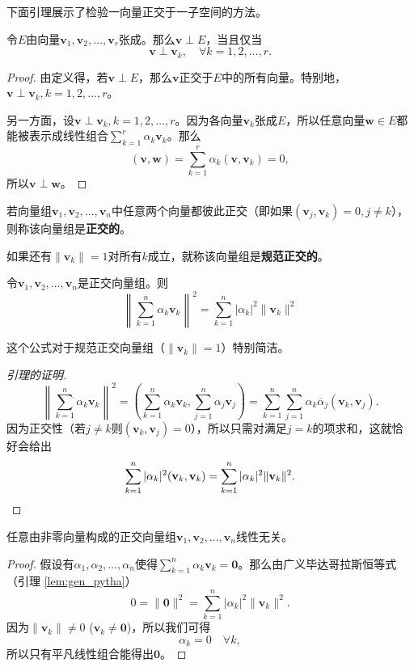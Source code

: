 下面引理展示了检验一向量正交于一子空间的方法。

\begin{lemma}\label{lem:vec_ortho_subspace}
    令$E$由向量$\mathbf{v}_{1},\mathbf{v}_{2},\ldots,\mathbf{v}_{r}$张成。那么$\mathbf{v}\perp E$，当且仅当\[\mathbf{v}\perp\mathbf{v}_{k},\quad\forall k=1,2,\ldots,r.\]
\end{lemma}
\begin{proof}
    由定义得，若$\mathbf{v}\perp E$，那么$\mathbf{v}$正交于$E$中的所有向量。特别地，$\mathbf{v}\perp\mathbf{v}_{k}, k=1,2,\ldots,r$。

    另一方面，设$\mathbf{v}\perp\mathbf{v}_{k}, k=1,2,\ldots,r$。因为各向量$\mathbf{v}_k$张成$E$，所以任意向量$\mathbf{w}\in E$都能被表示成线性组合$\sum_{k=1}^{r}\alpha_{k}\mathbf{v}_{k}$。那么\[(\mathbf{v},\mathbf{w})=\sum_{k=1}^r\alpha_k(\mathbf{v},\mathbf{v}_k)=0,\]
    所以$\mathbf{v}\perp \mathbf{w}$。
\end{proof}
\begin{definition}
    若向量组$\mathbf{v}_{1},\mathbf{v}_{2},\ldots,\mathbf{v}_{n}$中任意两个向量都彼此正交（即如果$(\mathbf{v}_{j},\mathbf{v}_{k})=0,j\neq k$），则称该向量组是{\bf 正交的}。

    如果还有$\|\mathbf{v}_k\|=1$对所有$k$成立，就称该向量组是{\bf 规范正交的}。
\end{definition}

\begin{lemma}[广义毕达哥拉斯恒等式]\label{lem:gen_pytha}
    令$\mathbf{v}_{1},\mathbf{v}_{2},\ldots,\mathbf{v}_{n}$是正交向量组。则\[\left\|\sum_{k=1}^n\alpha_k\mathbf{v}_k\right\|^2=\sum_{k=1}^n|\alpha_k|^2\|\mathbf{v}_k\|^2\]
\end{lemma}

这个公式对于规范正交向量组（$\|\mathbf{v}_k\|=1$）特别简洁。

\begin{proof}[引理的证明]
    \[\left\|\sum_{k=1}^{n}\alpha_{k}\mathbf{v}_{k}\right\|^{2}=\left(\sum_{k=1}^{n}\alpha_{k}\mathbf{v}_{k},\sum_{j=1}^{n}\alpha_{j}\mathbf{v}_{j}\right)=\sum_{k=1}^{n}\sum_{j=1}^{n}\alpha_{k}\overline{\alpha}_{j}(\mathbf{v}_{k},\mathbf{v}_{j}).\]
    因为正交性（若$j\neq k$则$(\mathbf{v}_{k},\mathbf{v}_{j})=0$），所以只需对满足$j=k$的项求和，这就恰好会给出\[\sum_{k=1}^n|\alpha_k|^2(\mathbf{v}_k,\mathbf{v}_k)=\sum_{k=1}^n|\alpha_k|^2\|\mathbf{v}_k\|^2.\qedhere\]
\end{proof}

\begin{corollary}
    任意由非零向量构成的正交向量组$\mathbf{v}_{1},\mathbf{v}_{2},\ldots,\mathbf{v}_{n}$线性无关。
\end{corollary}
\begin{proof}
    假设有$\alpha_1,\alpha_2,\dots,\alpha_n$使得$\sum_{k=1}^n\alpha_k\mathbf{v}_k=\mathbf{0}$。那么由广义毕达哥拉斯恒等式（引理 \ref{lem:gen_pytha}）
    \[0=\|\mathbf{0}\|^2=\sum_{k=1}^n|\alpha_k|^2\|\mathbf{v}_k\|^2.\]
    因为$\|\mathbf{v}_k\|\ne0$ ($\mathbf{v}_k\ne\mathbf{0}$)，所以我们可得
    \[\alpha_k=0\quad\forall k,\]所以只有平凡线性组合能得出$\mathbf{0}$。
\end{proof}

